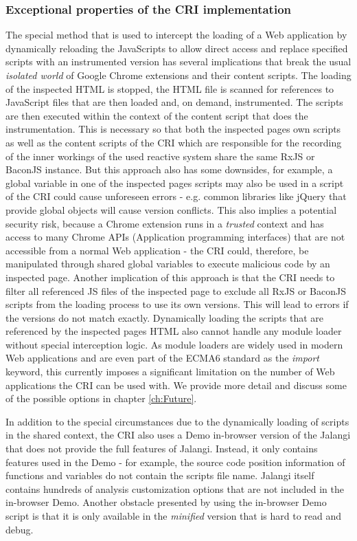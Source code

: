 	\subsubsection{Exceptional properties of the CRI implementation}
	\label{sec:CRISpecials}
	The special method that is used to intercept the loading of a Web application by dynamically reloading the JavaScripts to allow direct access and replace specified scripts with an instrumented version has several implications that break the usual \emph{isolated world} \cite{GoogleApiContentScripts} of Google Chrome extensions and their content scripts. The loading of the inspected HTML is stopped, the HTML file is scanned for references to JavaScript files that are then loaded and, on demand, instrumented. The scripts are then executed within the context of the content script that does the instrumentation. This is necessary so that both the inspected pages own scripts as well as the content scripts of the CRI which are responsible for the recording of the inner workings of the used reactive system share the same RxJS or BaconJS instance. But this approach also has some downsides, for example, a global variable in one of the inspected pages scripts may also be used in a script of the CRI could cause unforeseen errors - e.g. common libraries like jQuery \cite{jQuery} that provide global objects will cause version conflicts. This also implies a potential security risk, because a Chrome extension runs in a \emph{trusted} context and has access to many Chrome APIs (Application programming interfaces) that are not accessible from a normal Web application - the CRI could, therefore, be manipulated through shared global variables to execute malicious code by an inspected page.
	Another implication of this approach is that the CRI needs to filter all referenced JS files of the inspected page to exclude all RxJS or BaconJS scripts from the loading process to use its own versions. This will lead to errors if the versions do not match exactly.
	Dynamically loading the scripts that are referenced by the inspected pages HTML also cannot handle any module loader without special interception logic. As module loaders are widely used in modern Web applications and are even part of the ECMA6 \cite{ECMA6import} standard as the \emph{import} keyword, this currently imposes a significant limitation on the number of Web applications the CRI can be used with. We provide more detail and discuss some of the possible options in chapter \ref{ch:Future}.
	
	In addition to the special circumstances due to the dynamically loading of scripts in the shared context, the CRI also uses a Demo \cite{JalangiDemo} in-browser version of the Jalangi \cite{Jalangi} that does not provide the full features of Jalangi. Instead, it only contains features used in the Demo - for example, the source code position information of functions and variables do not contain the scripts file name. Jalangi itself contains hundreds of analysis customization options that are not included in the in-browser Demo. Another obstacle presented by using the in-browser Demo script is that it is only available in the \emph{minified} version that is hard to read and debug.
	
